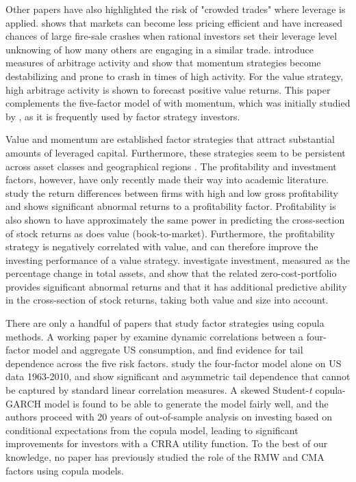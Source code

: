 Other papers have also highlighted the risk of "crowded trades" where leverage is applied. \textcite{Stein2009} shows that markets can become less pricing efficient and have increased chances of large fire-sale crashes when rational investors set their leverage level unknowing of how many others are engaging in a similar trade. \textcite{LouPolk2013} introduce measures of arbitrage activity and show that momentum strategies become destabilizing and prone to crash in times of high activity. For the value strategy, high arbitrage activity is shown to forecast positive value returns. This paper complements the five-factor model of \textcite{FF2015} with momentum, which was initially studied by \textcite{JegadeeshTitman1993}, as it is frequently used by factor strategy investors. 

Value and momentum are established factor strategies that attract substantial amounts of leveraged capital. Furthermore, these strategies seem to be persistent across asset classes and geographical regions \autocite{AsnessMoskovitzPedersen2013}. The profitability and investment factors, however, have only recently made their way into academic literature. \textcite{NovyMarx2013} study the return differences between firms with high and low gross profitability and shows significant abnormal returns to a profitability factor. Profitability is also shown to have approximately the same power in predicting the cross-section of stock returns as does value (book-to-market). Furthermore, the profitability strategy is negatively correlated with value, and can therefore improve the investing performance of a value strategy. \textcite{CooperGulenSchill2008} investigate investment, measured as the percentage change in total assets, and show that the related zero-cost-portfolio provides significant abnormal returns and that it has additional predictive ability in the cross-section of stock returns, taking both value and size into account.

There are only a handful of papers that study factor strategies using copula methods. A working paper by \textcite{CholleteNing2012} examine dynamic correlations between a four-factor model and aggregate US consumption, and find evidence for tail dependence across the five risk factors. \textcite{ChristoffersenLanglois2013} study the four-factor model alone on US data 1963-2010, and show significant and asymmetric tail dependence that cannot be captured by standard linear correlation measures. A skewed Student-\textit{t} copula-GARCH model is found to be able to generate the model fairly well, and the authors proceed with 20 years of out-of-sample analysis on investing based on conditional expectations from the copula model, leading to significant improvements for investors with a CRRA utility function. To the best of our knowledge, no paper has previously studied the role of the RMW and CMA factors using copula models.